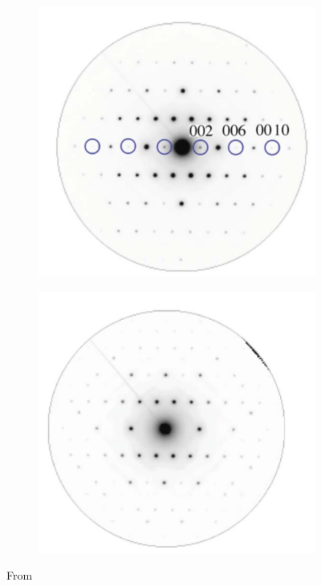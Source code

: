 \begin{figure}
	\centering
	\begin{subfigure}{0.45\textwidth}
		\includegraphics[width=\textwidth]{fig/other/dyndiff1}
		\caption{}
		\label{fig:dyndiff1}
	\end{subfigure}
	\hfill
	\begin{subfigure}{0.45\textwidth}
		\includegraphics[width=\textwidth]{fig/other/dyndiff2}
		\caption{}
		\label{fig:dyndiff2}
	\end{subfigure}
	\caption{
		\label{fig:dyndiff}%
		From \cite{williams-carter}}
\end{figure}

